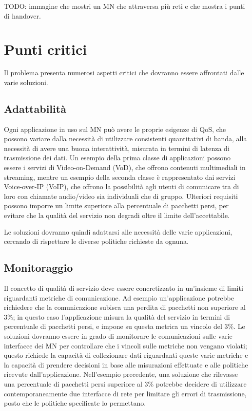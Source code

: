 \documentclass[12pt,a4paper,openright,twoside]{book}
\begin{document}
TODO: immagine che mostri un MN che attraversa più reti e che mostra i
punti di handover.

\section{Punti critici}
\label{sec:punti-critici}
Il problema presenta numerosi aspetti critici che dovranno essere
affrontati dalle varie soluzioni.

\subsection{Adattabilità}
Ogni applicazione in uso sul MN può avere le proprie esigenze di QoS,
che possono variare dalla necessità di utilizzare consistenti
quantitativi di banda, alla necessità di avere una buona
interattività, misurata in termini di latenza di trasmissione dei
dati. Un esempio della prima classe di applicazioni possono essere i
servizi di Video-on-Demand (VoD), che offrono contenuti multimediali
in streaming, mentre un esempio della seconda classe è rappresentato
dai servizi Voice-over-IP (VoIP), che offrono la possibilità agli
utenti di comunicare tra di loro con chiamate audio/video sia
individuali che di gruppo. Ulteriori requisiti possono imporre un
limite superiore alla percentuale di pacchetti persi, per evitare che
la qualità del servizio non degradi oltre il limite dell'accettabile.

Le soluzioni dovranno quindi adattarsi alle necessità delle varie
applicazioni, cercando di rispettare le diverse politiche richieste da
ognuna.

\subsection{Monitoraggio}
Il concetto di qualità di servizio deve essere concretizzato in
un'insieme di limiti riguardanti metriche di comunicazione. Ad esempio
un'applicazione potrebbe richiedere che la comunicazione subisca una
perdita di pacchetti non superiore al 3\%; in questo caso
l'applicazione misura la qualità del servizio in termini di
percentuale di pacchetti persi, e impone su questa metrica un vincolo
del 3\%. Le soluzioni dovranno essere in grado di monitorare le
comunicazioni sulle varie interfacce dei MN per controllare che i
vincoli sulle metriche non vengano violati; questo richiede la
capacità di collezionare dati riguardanti queste varie metriche e la
capacità di prendere decisioni in base alle misurazioni effettuate e
alle politiche ricevute dall'applicazione. Nell'esempio precedente,
una soluzione che rilevasse una percentuale di pacchetti persi
superiore al 3\% potrebbe decidere di utilizzare contemporaneamente
due interfacce di rete per limitare gli errori di trasmissione, posto
che le politiche specificate lo permettano.
\end{document}
